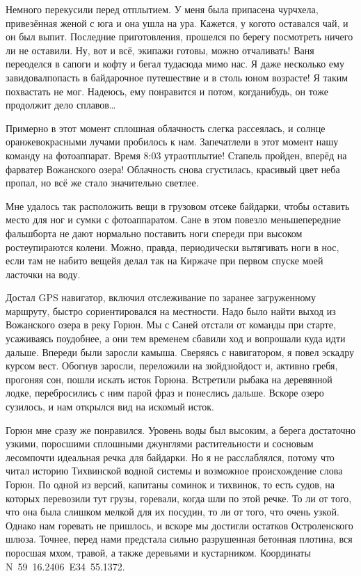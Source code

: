 Немного перекусили перед отплытием. У меня была припасена чурчхела, привезённая женой с юга и она ушла на ура. Кажется, у кого\sdash то оставался чай, и он был выпит. Последние приготовления, прошелся по берегу посмотреть ничего ли не оставили. Ну, вот и всё, экипажи готовы, можно отчаливать! Ваня переоделся в сапоги и кофту и бегал туда\sdash сюда мимо нас. Я даже несколько ему завидовал\mdash попасть в байдарочное путешествие и в столь юном возрасте! Я таким похвастать не мог. Надеюсь, ему понравится и потом, когда\sdash нибудь, он тоже продолжит дело сплавов\ldots

Примерно в этот момент сплошная облачность слегка рассеялась, и солнце оранжево\sdash красными лучами пробилось к нам. Запечатлели в этот момент нашу команду на фотоаппарат. Время 8:03 утра\mdash отплытие! Стапель пройден, вперёд на фарватер Вожанского  озера! Облачность снова сгустилась, красивый цвет неба пропал, но всё же стало значительно светлее.

Мне удалось так расположить вещи в грузовом отсеке байдарки, чтобы оставить место для ног и сумки с фотоаппаратом. Сане в этом повезло меньше\mdash передние фальшборта не дают нормально поставить ноги спереди при высоком росте\mdash упираются колени. Можно, правда, периодически вытягивать ноги в нос, если там не набито вещей\mdash я делал так на Киржаче при первом спуске моей ласточки на воду.  

Достал GPS навигатор, включил отслеживание по заранее загруженному маршруту, быстро сориентировался на местности. Надо было найти выход из Вожанского озера в реку Горюн. Мы с Саней отстали от команды при старте, усаживаясь поудобнее, а они тем временем сбавили ход и вопрошали куда идти дальше. Впереди были заросли камыша. Сверяясь с навигатором, я повел эскадру курсом вест. Обогнув заросли, переложили на зюйд\sdash зюйд\sdash ост и, активно гребя, прогоняя сон, пошли искать исток Горюна. Встретили рыбака на деревянной лодке, перебросились с ним парой фраз и понеслись дальше. Вскоре озеро сузилось, и нам открылся вид на искомый исток.

Горюн мне сразу же понравился. Уровень воды был высоким, а берега достаточно узкими, поросшими сплошными джунглями растительности и сосновым лесом\mdash почти идеальная речка для байдарки. Но я не расслаблялся, потому что читал историю Тихвинской водной системы и возможное происхождение слова Горюн. По одной из версий, капитаны соминок и тихвинок, то есть судов, на которых перевозили тут грузы, горевали, когда шли по этой речке. То ли от того, что она была слишком мелкой для их посудин, то ли от того, что очень узкой. Однако нам горевать не пришлось, и вскоре мы достигли остатков Остроленского шлюза. Точнее, перед нами предстала сильно разрушенная бетонная плотина, вся поросшая мхом, травой, а также деревьями и кустарником. Координаты N~59\degree~16.2406\textprime~E34\degree~55.1372\textprime. 

